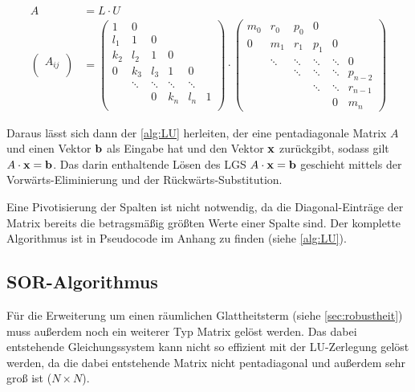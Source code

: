 \begin{align}
A &= L \cdot U \\
\label{eq:lu:structure}
\begin{pmatrix}
A_{ij}\\
\end{pmatrix}
&= 
\begin{pmatrix}
1 & 0 &  \\
l_1 & 1 & 0 &\\
k_2 & l_2 & 1 & 0 &\\
0 & k_3 & l_3 & 1 & 0 &\\
  &   \ddots  & \ddots & \ddots & \ddots\\
  & & 0& k_n & l_n & 1\\
\end{pmatrix}
\cdot
\begin{pmatrix}
m_0 & r_0 & p_0 & 0 &  \\
0 & m_1 & r_1 & p_1 & 0 &  \\
 & \ddots& \ddots & \ddots & \ddots & 0\\
 & & \ddots&\ddots&\ddots & p_{n-2}\\
 & & &\ddots&\ddots & r_{n-1}\\
&&  & &0& m_n 
\end{pmatrix}
\end{align}

Daraus lässt sich dann der \autoref{alg:LU} herleiten, der eine pentadiagonale Matrix $A$ und einen Vektor $\mathbf b$ als Eingabe hat und den Vektor $\mathbf x$ zurückgibt, sodass gilt $A \cdot \mathbf x = \mathbf b$. Das darin enthaltende Lösen des LGS $A\cdot \mathbf x = \mathbf b$ geschieht mittels der Vorwärts-Eliminierung und der Rückwärts-Substitution. 

Eine Pivotisierung der Spalten ist nicht notwendig, da die Diagonal-Einträge der Matrix bereits die betragsmäßig größten Werte einer Spalte sind. Der komplette Algorithmus ist in Pseudocode im Anhang zu finden (siehe \ref{alg:LU}).



\subsection{SOR-Algorithmus}
\label{sec:maths:sor}

Für die Erweiterung um einen räumlichen Glattheitsterm (siehe \autoref{sec:robustheit}) muss außerdem noch ein weiterer Typ Matrix gelöst werden. Das dabei entstehende Gleichungssystem kann nicht so effizient mit der LU-Zerlegung gelöst werden, da die dabei entstehende Matrix nicht pentadiagonal und außerdem sehr groß ist ($N \times N$). 

